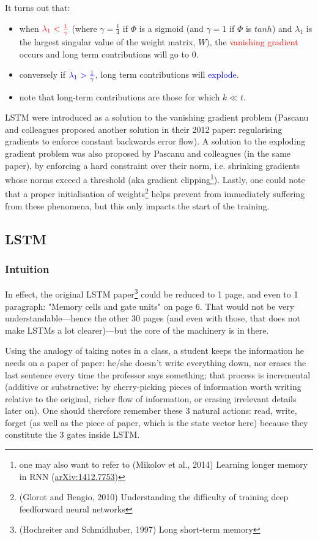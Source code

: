 \documentclass{article}
\begin{document}
It turns out that:
\begin{itemize}[noitemsep,topsep=0pt]
  \item when $\textcolor{red}{\lambda_1 < \frac{1}{\gamma}}$ (where $\gamma=\frac{1}{4}$ if $\Phi$ is a sigmoid (and $\gamma=1$ if $\Phi$ is $tanh$) and
        $\lambda_1$ is the largest singular value of the weight matrix, $W$), the \textcolor{red}{vanishing gradient} occurs and long term contributions will go to 0.
  \item conversely if $\textcolor{blue}{\lambda_1 > \frac{1}{\gamma}}$, long term contributions will \textcolor{blue}{explode}.
  \item note that long-term contributions are those for which $k\ll t$.
\end{itemize}


LSTM were introduced as a solution to the vanishing gradient problem (Pascanu and colleagues proposed another solution in their 2012 paper: regularising gradients to enforce constant backwards error flow). A solution to the exploding gradient problem was also proposed by Pascanu and colleagues (in the same paper), by enforcing a hard constraint over their norm, i.e. shrinking gradients whose norms exceed a threshold (aka gradient clipping\footnote{one may also want to refer to (Mikolov et al., 2014) Learning longer memory in RNN (\href{https://arxiv.org/abs/1412.7753}{arXiv:1412.7753})}). Lastly, one could note that a proper initialisation of weights\footnote{(Glorot and Bengio, 2010) Understanding the difficulty of training deep feedforward neural networks} helps prevent from immediately suffering from these phenomena, but this only impacts the start of the training.


\subsection{LSTM}

\subsubsection{Intuition}
In effect, the original LSTM paper\footnote{(Hochreiter and Schmidhuber, 1997) Long short-term memory} could be reduced to 1 page, and even to 1 paragraph: "Memory cells and gate units" on page 6. That would not be very understandable---hence the other 30 pages (and even with those, that does not make LSTMs a lot clearer)---but the core of the machinery is in there.

Using the analogy of taking notes in a class, a student keeps the information he needs on a paper of paper: he/she doesn't write everything down, nor erases the last sentence every time the professor says something; that process is incremental (additive or substractive: by cherry-picking pieces of information worth writing relative to the original, richer flow of information, or erasing irrelevant details later on). One should therefore remember these 3 natural actions: read, write, forget (as well as the piece of paper, which is the state vector here) because they constitute the 3 gates inside LSTM.
\end{document}
